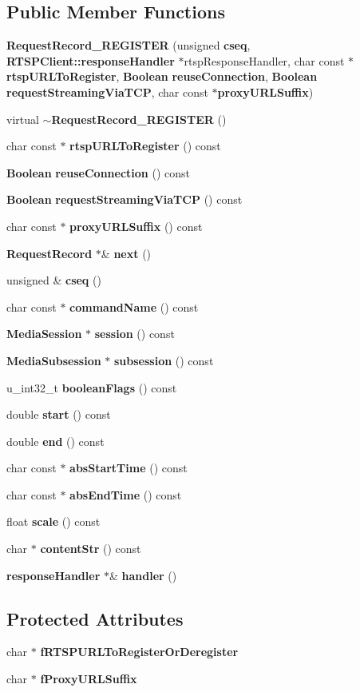 \subsection*{Public Member Functions}
\begin{DoxyCompactItemize}
\item 
{\bf Request\+Record\+\_\+\+R\+E\+G\+I\+S\+T\+E\+R} (unsigned {\bf cseq}, {\bf R\+T\+S\+P\+Client\+::response\+Handler} $\ast$rtsp\+Response\+Handler, char const $\ast${\bf rtsp\+U\+R\+L\+To\+Register}, {\bf Boolean} {\bf reuse\+Connection}, {\bf Boolean} {\bf request\+Streaming\+Via\+T\+C\+P}, char const $\ast${\bf proxy\+U\+R\+L\+Suffix})
\item 
virtual {\bf $\sim$\+Request\+Record\+\_\+\+R\+E\+G\+I\+S\+T\+E\+R} ()
\item 
char const $\ast$ {\bf rtsp\+U\+R\+L\+To\+Register} () const 
\item 
{\bf Boolean} {\bf reuse\+Connection} () const 
\item 
{\bf Boolean} {\bf request\+Streaming\+Via\+T\+C\+P} () const 
\item 
char const $\ast$ {\bf proxy\+U\+R\+L\+Suffix} () const 
\item 
{\bf Request\+Record} $\ast$\& {\bf next} ()
\item 
unsigned \& {\bf cseq} ()
\item 
char const $\ast$ {\bf command\+Name} () const 
\item 
{\bf Media\+Session} $\ast$ {\bf session} () const 
\item 
{\bf Media\+Subsession} $\ast$ {\bf subsession} () const 
\item 
u\+\_\+int32\+\_\+t {\bf boolean\+Flags} () const 
\item 
double {\bf start} () const 
\item 
double {\bf end} () const 
\item 
char const $\ast$ {\bf abs\+Start\+Time} () const 
\item 
char const $\ast$ {\bf abs\+End\+Time} () const 
\item 
float {\bf scale} () const 
\item 
char $\ast$ {\bf content\+Str} () const 
\item 
{\bf response\+Handler} $\ast$\& {\bf handler} ()
\end{DoxyCompactItemize}
\subsection*{Protected Attributes}
\begin{DoxyCompactItemize}
\item 
char $\ast$ {\bf f\+R\+T\+S\+P\+U\+R\+L\+To\+Register\+Or\+Deregister}
\item 
char $\ast$ {\bf f\+Proxy\+U\+R\+L\+Suffix}
\end{DoxyCompactItemize}
